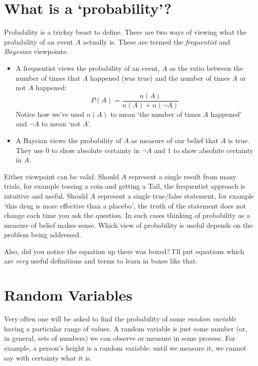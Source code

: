 \documentclass[a4paper]{article}
\begin{document}
\section{What is a `probability'?}

Probability is a tricksy beast to define. There are two ways of viewing what
the probability of an event $A$ actually is. These are termed the
\emph{frequentist} and \emph{Bayesian} viewpoints:

\begin{itemize}

\item A frequentist views the probability of an event, $A$ as the ratio between
the number of times that $A$ happened (was true) and the number of times $A$ or
not $A$ happened:
\[
\boxed{ P(A) = \frac{n(A)}{n(A) + n(\lnot A)} }
\]
Notice how we've used $n(A)$ to mean `the number of times $A$ happened' and
$\lnot A$ to mean `not $A$'.

\item A Baysian views the probability of $A$ as measure of our belief that $A$
is true. They use $0$ to show absolute certainty in $\lnot A$ and $1$ to show
absolute certainty in $A$.

\end{itemize}

Either viewpoint can be valid. Should $A$ represent a single result from many
trials, for example tossing a coin and getting a Tail, the frequentist approach
is intuitive and useful. Should $A$ represent a single true/false statement,
for example `this drug is more effective than a placebo', the truth of the
statement does not change each time you ask the question. In such cases
thinking of probability as a measure of belief makes sense. Which view of
probability is useful depends on the problem being addressed.

Also, did you notice the equation up there was boxed? I'll put equations which
are \emph{very} useful definitions and terms to learn in boxes like that.

\section{Random Variables}

Very often one will be asked to find the probability of some \emph{random
variable} having a particular range of values. A random variable is just some
number (or, in general, sets of numbers) we can observe or measure in some
process. For example, a person's height is a random variable: until we measure
it, we cannot say with certainty what it is.
\end{document}
